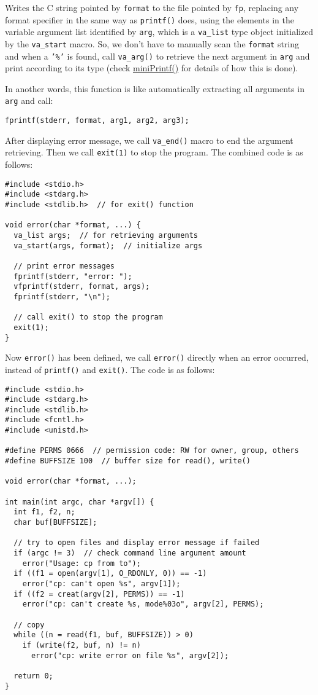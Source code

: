 \documentclass[12pt]{article}
\begin{document}
Writes the C string pointed by \texttt{format} to the file pointed by \texttt{fp}, replacing any format specifier in the same way as \texttt{printf()} does, using the elements in the variable argument list identified by \texttt{arg}, which is a \texttt{va\_list} type object initialized by the \texttt{va\_start} macro. So, we don't have to manually scan the \texttt{format} string and when a \texttt{'\%'} is found, call \texttt{va\_arg()} to retrieve the next argument in \texttt{arg} and print according to its type (check \hyperref[org4bb8c28]{miniPrintf()} for details of how this is done).

In another words, this function is like automatically extracting all arguments in \texttt{arg} and call:
\begin{verbatim}
fprintf(stderr, format, arg1, arg2, arg3);
\end{verbatim}

After displaying error message, we call \texttt{va\_end()} macro to end the argument retrieving. Then we call \texttt{exit(1)} to stop the program. The combined code is as follows:
\begin{verbatim}
#include <stdio.h>
#include <stdarg.h>
#include <stdlib.h>  // for exit() function

void error(char *format, ...) {
  va_list args;  // for retrieving arguments
  va_start(args, format);  // initialize args

  // print error messages
  fprintf(stderr, "error: ");
  vfprintf(stderr, format, args);
  fprintf(stderr, "\n");

  // call exit() to stop the program
  exit(1);
}
\end{verbatim}

Now \texttt{error()} has been defined, we call \texttt{error()} directly when an error occurred, instead of \texttt{printf()} and \texttt{exit()}. The code is as follows:
\begin{verbatim}
#include <stdio.h>
#include <stdarg.h>
#include <stdlib.h>
#include <fcntl.h>
#include <unistd.h>

#define PERMS 0666  // permission code: RW for owner, group, others
#define BUFFSIZE 100  // buffer size for read(), write()

void error(char *format, ...);

int main(int argc, char *argv[]) {
  int f1, f2, n;
  char buf[BUFFSIZE];

  // try to open files and display error message if failed
  if (argc != 3)  // check command line argument amount
    error("Usage: cp from to");
  if ((f1 = open(argv[1], O_RDONLY, 0)) == -1)
    error("cp: can't open %s", argv[1]);
  if ((f2 = creat(argv[2], PERMS)) == -1)
    error("cp: can't create %s, mode%03o", argv[2], PERMS);

  // copy
  while ((n = read(f1, buf, BUFFSIZE)) > 0)
    if (write(f2, buf, n) != n)
      error("cp: write error on file %s", argv[2]);

  return 0;
}
\end{verbatim}
\end{document}
